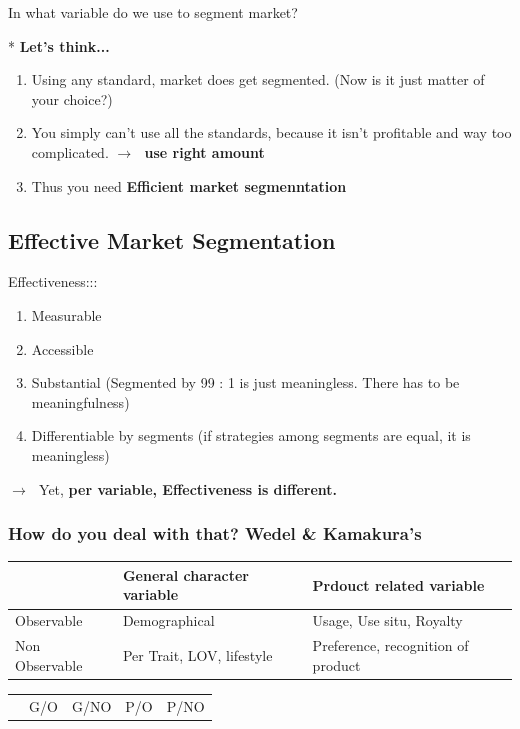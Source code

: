 \documentclass[12pt]{article}
\newcommand{\ra}{$\rightarrow \text{ }$}
\begin{document}
{\large In what variable do we use to segment market?}

* \textbf{Let's think...}
\begin{enumerate}
	\item Using any standard, market does get segmented. (Now is it just matter of your choice?)
	\item You simply can't use all the standards, because it isn't profitable and way too complicated. \ra \textbf{use right amount}
	\item Thus you need \textbf{Efficient market segmenntation}
\end{enumerate}

\subsection{Effective Market Segmentation}
{\large Effectiveness:::}
\begin{enumerate}
	\item Measurable %
	\item Accessible
	\item Substantial (Segmented by 99 : 1 is just meaningless. There has to be meaningfulness)
	\item Differentiable by segments (if strategies among segments are equal, it is meaningless)
\end{enumerate}

\ra Yet, \textbf{per variable, Effectiveness is different.} %

\subsubsection{How do you deal with that? Wedel \& Kamakura's}
\begin{center}
	\begin{tabular}{m{12em}|m{12em}|m{12em}|}
		\hline
		& General character variable & Prdouct related variable \\ [2ex]
		\hline
		Observable & Demographical & Usage, Use situ, Royalty \\ [2ex]
		\hline
		Non Observable & Per Trait, LOV, lifestyle & Preference, recognition of product \\ [2ex]
		\hline

\end{tabular}
\end{center}

\begin{tabular}{|c|c|c|c|c|}
	\hline
	 & G/O & G/NO & P/O & P/NO \\

\end{tabular}
\end{document}

